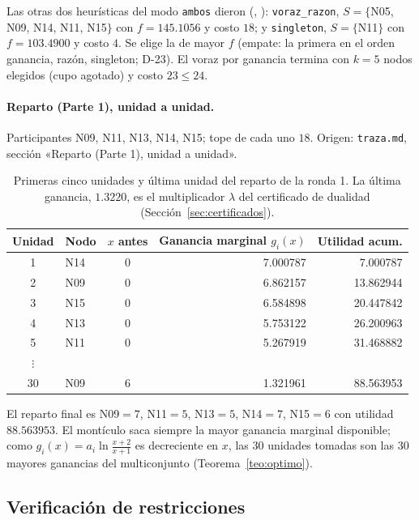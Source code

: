Las otras dos heurísticas del modo \texttt{ambos} dieron (, ): \texttt{voraz\_razon}, $S=\{$N05, N09, N14, N11, N15$\}$ con $f=145.1056$ y costo $18$; y \texttt{singleton}, $S=\{$N11$\}$ con $f=103.4900$ y costo $4$. Se elige la de mayor $f$ (empate: la primera en el orden ganancia, razón, singleton; D-23). El voraz por ganancia termina con $k=5$ nodos elegidos (cupo agotado) y costo $23\le24$.

\paragraph{Reparto (Parte 1), unidad a unidad.} Participantes N09, N11, N13, N14, N15; tope de cada uno $18$. Origen: \texttt{traza.md}, sección «Reparto (Parte 1), unidad a unidad».

\begin{table}[h]
\centering
\small
\begin{tabular}{@{}c l c r r@{}}
\toprule
Unidad & Nodo & $x$ antes & Ganancia marginal $g_i(x)$ & Utilidad acum.\\
\midrule
1 & N14 & 0 & 7.000787 & 7.000787\\
2 & N09 & 0 & 6.862157 & 13.862944\\
3 & N15 & 0 & 6.584898 & 20.447842\\
4 & N13 & 0 & 5.753122 & 26.200963\\
5 & N11 & 0 & 5.267919 & 31.468882\\
$\vdots$ & & & &\\
30 & N09 & 6 & 1.321961 & 88.563953\\
\bottomrule
\end{tabular}
\caption{Primeras cinco unidades y última unidad del reparto de la ronda 1. La última ganancia, $1.3220$, es el multiplicador $\lambda$ del certificado de dualidad (Sección~\ref{sec:certificados}).}\label{tab:traza-rep}
\end{table}

El reparto final es N09$=7$, N11$=5$, N13$=5$, N14$=7$, N15$=6$ con utilidad $88.563953$. El montículo saca siempre la mayor ganancia marginal disponible; como $g_i(x)=a_i\ln\frac{x+2}{x+1}$ es decreciente en $x$, las 30 unidades tomadas son las 30 mayores ganancias del multiconjunto (Teorema~\ref{teo:optimo}).

\subsection{Verificación de restricciones}\label{sec:verificacion}

